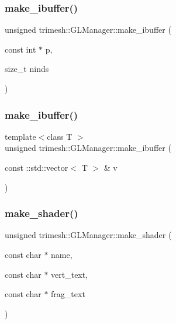 \subsubsection{\texorpdfstring{make\+\_\+ibuffer()}{make\_ibuffer()}\hspace{0.1cm}{\footnotesize\ttfamily [2/3]}}
{\footnotesize\ttfamily unsigned trimesh\+::\+G\+L\+Manager\+::make\+\_\+ibuffer (\begin{DoxyParamCaption}\item[{const int $\ast$}]{p,  }\item[{size\+\_\+t}]{ninds }\end{DoxyParamCaption})\hspace{0.3cm}{\ttfamily [inline]}}

\mbox{\label{classtrimesh_1_1GLManager_a934c34d8f2f07457c53d225af87188fb}} 
\subsubsection{\texorpdfstring{make\+\_\+ibuffer()}{make\_ibuffer()}\hspace{0.1cm}{\footnotesize\ttfamily [3/3]}}
{\footnotesize\ttfamily template$<$class T $>$ \\
unsigned trimesh\+::\+G\+L\+Manager\+::make\+\_\+ibuffer (\begin{DoxyParamCaption}\item[{const \+::std\+::vector$<$ T $>$ \&}]{v }\end{DoxyParamCaption})\hspace{0.3cm}{\ttfamily [inline]}}

\mbox{\label{classtrimesh_1_1GLManager_a94896722a1121f1e919acd6a7fb7131c}} 
\subsubsection{\texorpdfstring{make\+\_\+shader()}{make\_shader()}}
{\footnotesize\ttfamily unsigned trimesh\+::\+G\+L\+Manager\+::make\+\_\+shader (\begin{DoxyParamCaption}\item[{const char $\ast$}]{name,  }\item[{const char $\ast$}]{vert\+\_\+text,  }\item[{const char $\ast$}]{frag\+\_\+text }\end{DoxyParamCaption})}



